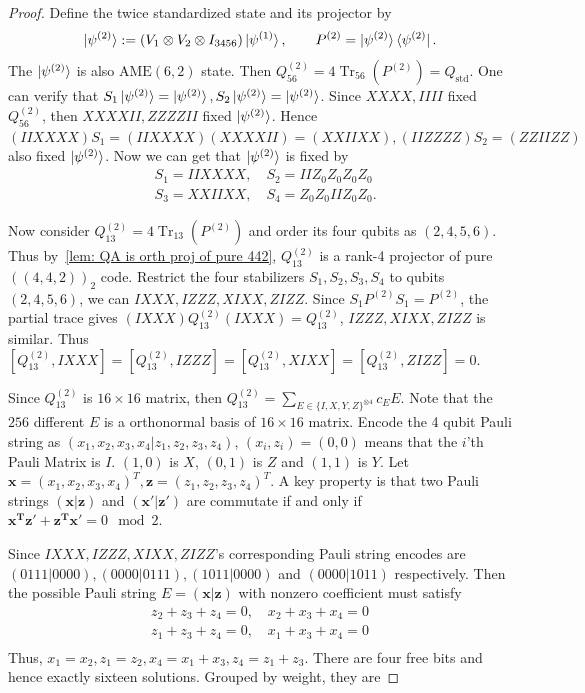 \begin{proof}
    Define the twice standardized state and its projector by
    \begin{equation}
        \ket{\psi^{(2)}}:=(V_1\otimes V_2\otimes I_{3456})\ket{\psi^{(1)}},\quad \quad P^{(2)}=\ket{\psi^{(2)}}\bra{\psi^{(2)}}.
    \end{equation}
    The $\ket{\psi^{(2)}}$ is also $\mathrm{AME}(6,2)$ state. Then $Q_{56}^{(2)}=4\operatorname{Tr}_{56}(P^{(2)})=Q_{\mathrm{std}}$.
    One can verify that $S_1\ket{\psi^{(2)}}=\ket{\psi^{(2)}},S_2\ket{\psi^{(2)}}=\ket{\psi^{(2)}}$. Since $XXXX,IIII$ fixed $Q_{56}^{(2)}$, then $XXXXII,ZZZZII$ fixed $\ket{\psi^{(2)}}$. Hence $(IIXXXX)S_1=(IIXXXX)(XXXXII)=(XXIIXX),(IIZZZZ)S_2=(ZZIIZZ)$ also fixed $\ket{\psi^{(2)}}$. Now we can get that $\ket{\psi^{(2)}}$ is fixed by 
    \begin{align*}
        &S_1=IIXXXX, \quad S_2=IIZ_0Z_0Z_0Z_0\\
        &S_3=XXIIXX, \quad S_4=Z_0Z_0IIZ_0Z_0.
    \end{align*}

    Now consider $Q_{13}^{(2)}=4\operatorname{Tr}_{13}(P^{(2)})$ and order its four qubits as $(2,4,5,6)$. Thus by~\cref{lem: QA is orth proj of pure 442}, $Q_{13}^{(2)}$ is a rank-4 projector of pure $((4,4,2))_2$ code. Restrict the four stabilizers $S_1,S_2,S_3,S_4$ to qubits $(2,4,5,6)$, we can $IXXX,IZZZ,XIXX,ZIZZ$. Since $S_1P^{(2)}S_1=P^{(2)}$, the partial trace gives $(IXXX)Q_{13}^{(2)}(IXXX)=Q_{13}^{(2)}$, $IZZZ,XIXX,ZIZZ$ is similar. Thus $[Q_{13}^{(2)},IXXX]=[Q_{13}^{(2)},IZZZ]=[Q_{13}^{(2)},XIXX]=[Q_{13}^{(2)},ZIZZ]=0$.

    Since $Q_{13}^{(2)}$ is $16\times 16$ matrix, then $Q_{13}^{(2)}=\sum_{E\in\{I,X,Y,Z\}^{\otimes 4}}c_E E$. Note that the $256$ different $E$ is a orthonormal basis of $16\times 16$ matrix. Encode the 4 qubit Pauli string as $(x_1,x_2,x_3,x_4|z_1,z_2,z_3,z_4)$, $(x_i,z_i)=(0,0)$ means that the $i$'th Pauli Matrix is $I$. $(1,0)$ is $X$, $(0,1)$ is $Z$ and $(1,1)$ is $Y$. Let $\mathbf{x}=(x_1,x_2,x_3,x_4)^T,\mathbf{z}=(z_1,z_2,z_3,z_4)^T$. A key property is that two Pauli strings  $(\mathbf{x|z})$ and $(\mathbf{x'|z'})$ are commutate if and only if $\mathbf{x^T z'+z^T x'}=0 \mod{2}$.

    Since $IXXX,IZZZ,XIXX,ZIZZ$'s corresponding Pauli string encodes are $(0111|0000),(0000|0111),(1011|0000)$ and $(0000|1011)$ respectively. Then the possible Pauli string $E=(\mathbf{x|z})$ with nonzero coefficient must satisfy 
    \begin{align*}
        z_2+z_3+z_4=0, \quad x_2+x_3+x_4=0\\
        z_1+z_3+z_4=0, \quad x_1+x_3+x_4=0\\
    \end{align*}
    Thus, $x_1=x_2,z_1=z_2,x_4=x_1+x_3,z_4=z_1+z_3$. There are four free bits and hence exactly sixteen solutions. Grouped by weight, they are


\end{proof}
